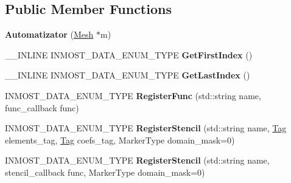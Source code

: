 \subsection*{Public Member Functions}
\begin{DoxyCompactItemize}
\item 
\hypertarget{classINMOST_1_1Automatizator_af7d1f8ab7fdfaeef7c7b09a1e699b743}{{\bfseries Automatizator} (\hyperlink{classINMOST_1_1Mesh}{Mesh} $\ast$m)}\label{classINMOST_1_1Automatizator_af7d1f8ab7fdfaeef7c7b09a1e699b743}

\item 
\hypertarget{classINMOST_1_1Automatizator_a205365a6d28b27703e6262158706f730}{\-\_\-\-\_\-\-I\-N\-L\-I\-N\-E I\-N\-M\-O\-S\-T\-\_\-\-D\-A\-T\-A\-\_\-\-E\-N\-U\-M\-\_\-\-T\-Y\-P\-E {\bfseries Get\-First\-Index} ()}\label{classINMOST_1_1Automatizator_a205365a6d28b27703e6262158706f730}

\item 
\hypertarget{classINMOST_1_1Automatizator_ab2efc0e101bf2ca4543e19265e06b822}{\-\_\-\-\_\-\-I\-N\-L\-I\-N\-E I\-N\-M\-O\-S\-T\-\_\-\-D\-A\-T\-A\-\_\-\-E\-N\-U\-M\-\_\-\-T\-Y\-P\-E {\bfseries Get\-Last\-Index} ()}\label{classINMOST_1_1Automatizator_ab2efc0e101bf2ca4543e19265e06b822}

\item 
\hypertarget{classINMOST_1_1Automatizator_a0128d1f5d5f89927eef74eb40ed84709}{I\-N\-M\-O\-S\-T\-\_\-\-D\-A\-T\-A\-\_\-\-E\-N\-U\-M\-\_\-\-T\-Y\-P\-E {\bfseries Register\-Func} (std\-::string name, func\-\_\-callback func)}\label{classINMOST_1_1Automatizator_a0128d1f5d5f89927eef74eb40ed84709}

\item 
\hypertarget{classINMOST_1_1Automatizator_a5b1b877a70e6692e4462df8fb96b8ef3}{I\-N\-M\-O\-S\-T\-\_\-\-D\-A\-T\-A\-\_\-\-E\-N\-U\-M\-\_\-\-T\-Y\-P\-E {\bfseries Register\-Stencil} (std\-::string name, \hyperlink{classINMOST_1_1Tag}{Tag} elements\-\_\-tag, \hyperlink{classINMOST_1_1Tag}{Tag} coefs\-\_\-tag, Marker\-Type domain\-\_\-mask=0)}\label{classINMOST_1_1Automatizator_a5b1b877a70e6692e4462df8fb96b8ef3}

\item 
\hypertarget{classINMOST_1_1Automatizator_aef8dd6329870287bbc5abb194322afb0}{I\-N\-M\-O\-S\-T\-\_\-\-D\-A\-T\-A\-\_\-\-E\-N\-U\-M\-\_\-\-T\-Y\-P\-E {\bfseries Register\-Stencil} (std\-::string name, stencil\-\_\-callback func, Marker\-Type domain\-\_\-mask=0)}\label{classINMOST_1_1Automatizator_aef8dd6329870287bbc5abb194322afb0}


\end{DoxyCompactItemize}

